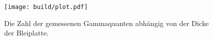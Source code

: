 




    
    \begin{figure}
        \centering
        \texttt{[image: build/plot.pdf]}
        \caption{Die Zahl der gemessenen Gammaquanten abhängig 
        von der Dicke der Bleiplatte.}
    \end{figure}
